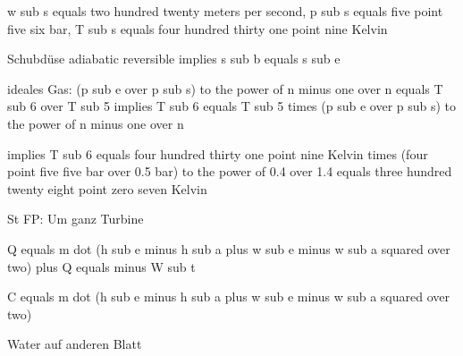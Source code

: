 w sub s equals two hundred twenty meters per second, p sub s equals five point five six bar, T sub s equals four hundred thirty one point nine Kelvin

Schubdüse adiabatic reversible implies s sub b equals s sub e

ideales Gas: (p sub e over p sub s) to the power of n minus one over n equals T sub 6 over T sub 5 implies T sub 6 equals T sub 5 times (p sub e over p sub s) to the power of n minus one over n

implies T sub 6 equals four hundred thirty one point nine Kelvin times (four point five five bar over 0.5 bar) to the power of 0.4 over 1.4 equals three hundred twenty eight point zero seven Kelvin

St FP: Um ganz Turbine

Q equals m dot (h sub e minus h sub a plus w sub e minus w sub a squared over two) plus Q equals minus W sub t

C equals m dot (h sub e minus h sub a plus w sub e minus w sub a squared over two)

Water auf anderen Blatt